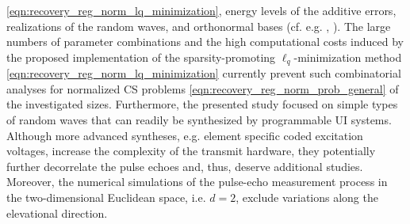 \eqref{eqn:recovery_reg_norm_lq_minimization},
energy levels of
the additive errors,
realizations of
the random waves, and
orthonormal bases
(cf. e.g.
  \cite[Figs. 1 and 2]{proc:ChartrandICASSP2008},
  \cite[Figs. 3 and 4]{article:ChartrandISPL2007}%
).
The large numbers of
parameter combinations and
the high computational costs induced by
the proposed implementation of
the sparsity-promoting $\ell_{q}$-minimization method
\eqref{eqn:recovery_reg_norm_lq_minimization} currently prevent
such combinatorial analyses for
normalized \ac{CS} problems
\eqref{eqn:recovery_reg_norm_prob_general} of
the investigated sizes.
Furthermore,
the presented study focused on
simple types of
random waves that
can readily be synthesized by
programmable \ac{UI} systems.
Although
more advanced syntheses, e.g.
element specific coded excitation voltages, increase
the complexity of
the transmit hardware,
they potentially further decorrelate
the pulse echoes and, thus, deserve
additional studies.
Moreover,
the numerical simulations of
the pulse-echo measurement process in
the two-dimensional Euclidean space, i.e. $d = 2$, exclude
variations along
the elevational direction.
